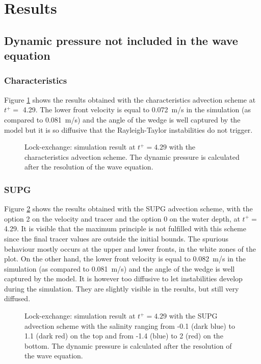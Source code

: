 \section{Results}

\subsection{Dynamic pressure not included in the wave equation}

\subsubsection{Characteristics}

Figure \ref{fig:lock-exchange_dp_no_carac} shows the results obtained with the
characteristics advection scheme at $t^+=$ 4.29.
The lower front velocity is equal to 0.072~m/s in the simulation (as compared
to 0.081~m/s) and the angle of the wedge is well captured
by the model but it is so diffusive that the Rayleigh-Taylor instabilities do not trigger.
\begin{figure}[ht]
  \begin{center}
    \caption{Lock-exchange: simulation result at $t^+=4.29$ with the characteristics advection scheme.
      The dynamic pressure is calculated after the resolution of the wave equation.}
    \label{fig:lock-exchange_dp_no_carac}
  \end{center}
\end{figure}

\subsubsection{SUPG}
Figure \ref{fig:lock-exchange_dp_no_SUPG} shows the results obtained with the
SUPG advection scheme, with the option 2 on the velocity and tracer and the
option 0 on the water depth, at $t^+=$ 4.29.
It is visible that the maximum principle is not fulfilled with this scheme since
the final tracer values are outside the initial bounds.
The spurious behaviour mostly occurs at the upper and lower fronts, in the white
zones of the plot.
On the other hand, the lower front velocity is equal to 0.082~m/s in the
simulation (as compared to 0.081~m/s) and the angle of the wedge
is well captured by the model. It is however too diffusive to let instabilities
develop during the simulation.
They are slightly visible in the results, but still very diffused.
\begin{figure}[ht]
  \begin{center}
    \caption{Lock-exchange: simulation result at $t^+=4.29$ with the SUPG advection scheme with the salinity ranging from -0.1 (dark blue)
      to 1.1 (dark red) on the top and from -1.4 (blue) to 2 (red) on the bottom.
      The dynamic pressure is calculated after the resolution of the wave equation.}
    \label{fig:lock-exchange_dp_no_SUPG}
  \end{center}
\end{figure}

